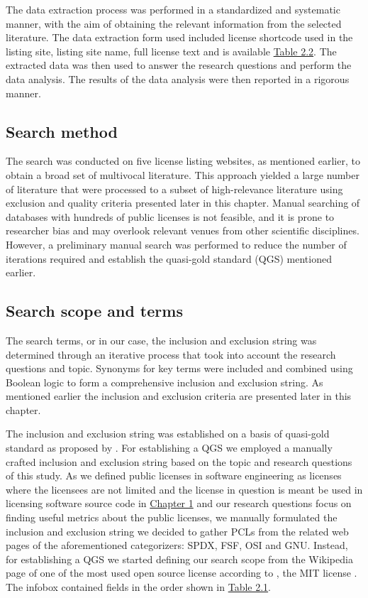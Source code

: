 The data extraction process was performed in a standardized and systematic manner, with the aim of obtaining the relevant information from the selected literature. The data extraction form used included license shortcode used in the listing site, listing site name, full license text and is available  \hyperref[table:extraction]{Table 2.2}. The extracted data was then used to answer the research questions and perform the data analysis. The results of the data analysis were then reported in a rigorous manner.

\subsection{Search method}
The search was conducted on five license listing websites, as mentioned earlier, to obtain a broad set of multivocal literature. This approach yielded a large number of literature that were processed to a subset of high-relevance literature using exclusion and quality criteria presented later in this chapter. Manual searching of databases with hundreds of public licenses is not feasible, and it is prone to researcher bias and may overlook relevant venues from other scientific disciplines. However, a preliminary manual search was performed to reduce the number of iterations required and establish the quasi-gold standard (QGS) mentioned earlier.

\subsection{Search scope and terms}
The search terms, or in our case, the inclusion and exclusion string was determined through an iterative process that took into account the research questions and topic. Synonyms for key terms were included and combined using Boolean logic to form a comprehensive inclusion and exclusion string. As mentioned earlier the inclusion and exclusion criteria are presented later in this chapter.

The inclusion and exclusion string was established on a basis of quasi-gold standard as proposed by \cite{qgs}. For establishing a QGS we employed a manually crafted inclusion and exclusion string based on the topic and research questions of this study. As we defined public licenses in software engineering as licenses where the licensees are not limited and the license in question is meant be used in licensing software source code in \hyperref[intro]{Chapter 1} and our research questions focus on finding useful metrics about the public licenses, we manually formulated the inclusion and exclusion string %
we decided to gather PCLs from the related web pages of the aforementioned categorizers: SPDX, FSF, OSI and GNU.
Instead, for establishing a QGS we started defining our search scope from the Wikipedia page of one of the most used open source license according to \cite{github:licenseusage}, the MIT license \citep{wikipedia:mit}. The infobox contained fields in the order shown in \hyperref[table:infobox]{Table 2.1}.

